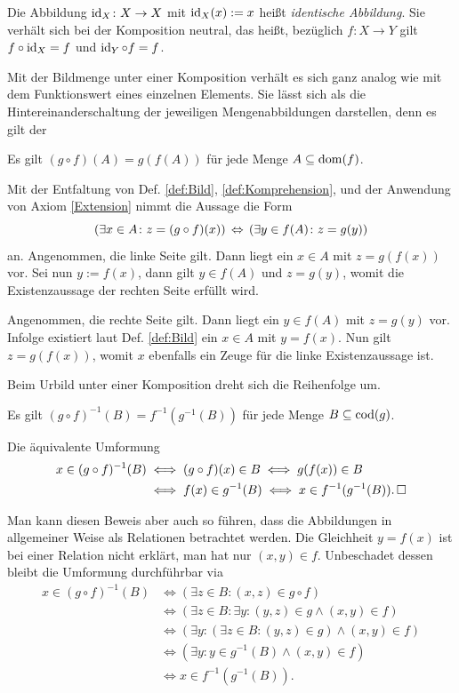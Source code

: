 \noindent
Die Abbildung $\operatorname{id}_X\colon X\to X$ mit $\operatorname{id}_X(x):=x$ heißt
\emph{identische Abbildung}. Sie verhält
sich bei der Komposition neutral, das heißt, bezüglich
$f\colon X\to Y$ gilt $f\circ\operatorname{id}_X = f$ und $\operatorname{id}_Y\circ f=f$.

Mit der Bildmenge unter einer Komposition verhält es sich ganz analog
wie mit dem Funktionswert eines einzelnen Elements. Sie lässt sich
als die Hintereinanderschaltung der jeweiligen Mengenabbildungen
darstellen, denn es gilt der

\begin{Satz}\label{Bild-unter-Komposition}
Es gilt $(g\circ f)(A) = g(f(A))$ für jede Menge $A\subseteq\operatorname{dom}(f)$.
\end{Satz}
\begin{Beweis}
Mit der Entfaltung von Def. \ref{def:Bild}, \ref{def:Komprehension},
und der Anwendung von Axiom \ref{Extension} nimmt die Aussage die Form
\[(\exists x\in A\colon z=(g\circ f)(x))\,\Leftrightarrow\,
(\exists y\in f(A)\colon z = g(y))\]
an. Angenommen, die linke Seite gilt. Dann liegt ein $x\in A$ mit
$z=g(f(x))$ vor. Sei nun $y:=f(x)$, dann gilt $y\in f(A)$ und $z=g(y)$,
womit die Existenzaussage der rechten Seite erfüllt wird.

Angenommen, die rechte Seite gilt. Dann liegt ein $y\in f(A)$ mit
$z=g(y)$ vor. Infolge existiert laut Def. \ref{def:Bild} ein $x\in A$ mit
$y=f(x)$. Nun gilt $z=g(f(x))$, womit $x$ ebenfalls ein Zeuge
für die linke Existenzaussage ist.\,\qedsymbol
\end{Beweis}

\noindent
Beim Urbild unter einer Komposition dreht sich die Reihenfolge um.
\begin{Satz}
Es gilt $(g\circ f)^{-1}(B) = f^{-1}(g^{-1}(B))$ für jede Menge
$B\subseteq\operatorname{cod}(g)$.
\end{Satz}
\begin{Beweis}
Die äquivalente Umformung
\begin{align*}
x\in (g\circ f)^{-1}(B) &\iff (g\circ f)(x)\in B \iff g(f(x))\in B\\
&\iff f(x)\in g^{-1}(B) \iff x\in f^{-1}(g^{-1}(B)).\,\Box
\end{align*}
\end{Beweis}

\noindent
Man kann diesen Beweis aber auch so führen, dass die Abbildungen in
allgemeiner Weise als Relationen betrachtet werden. Die Gleichheit
$y=f(x)$ ist bei einer Relation nicht erklärt, man hat nur $(x,y)\in f$.
Unbeschadet dessen bleibt die Umformung durchführbar via
\begin{align*}
x\in (g\circ f)^{-1}(B)
&\iff (\exists z\in B\colon (x,z)\in g\circ f)\\
&\iff (\exists z\in B\colon\exists y\colon (y,z)\in g \land (x,y)\in f)\\
&\iff (\exists y\colon (\exists z\in B\colon (y,z)\in g) \land (x,y)\in f)\\
&\iff (\exists y\colon y\in g^{-1}(B)\land (x,y)\in f)\\
&\iff x\in f^{-1}(g^{-1}(B)).
\end{align*}

